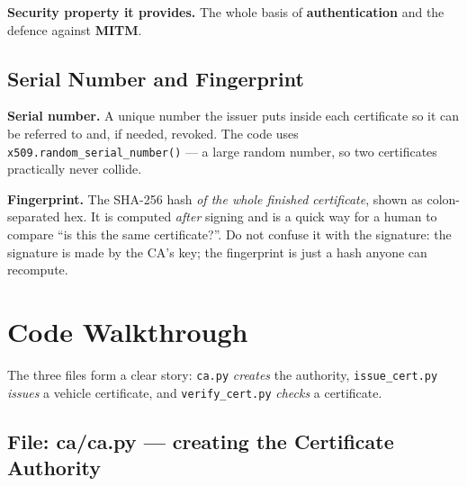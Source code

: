 \documentclass[11pt,a4paper]{report}
\begin{document}
\textbf{Security property it provides.} The whole basis of
\textbf{authentication} and the defence against \textbf{MITM}.

\subsection{Serial Number and Fingerprint}
\textbf{Serial number.} A unique number the issuer puts inside each certificate
so it can be referred to and, if needed, revoked. The code uses
\texttt{x509.random\_serial\_number()} --- a large random number, so two
certificates practically never collide.

\textbf{Fingerprint.} The SHA-256 hash \emph{of the whole finished certificate},
shown as colon-separated hex. It is computed \emph{after} signing and is a quick
way for a human to compare ``is this the same certificate?''. Do not confuse it
with the signature: the signature is made by the CA's key; the fingerprint is
just a hash anyone can recompute.

\section{Code Walkthrough}

The three files form a clear story: \texttt{ca.py} \emph{creates} the authority,
\texttt{issue\_cert.py} \emph{issues} a vehicle certificate, and
\texttt{verify\_cert.py} \emph{checks} a certificate.

\subsection{File: ca/ca.py --- creating the Certificate Authority}
\end{document}
